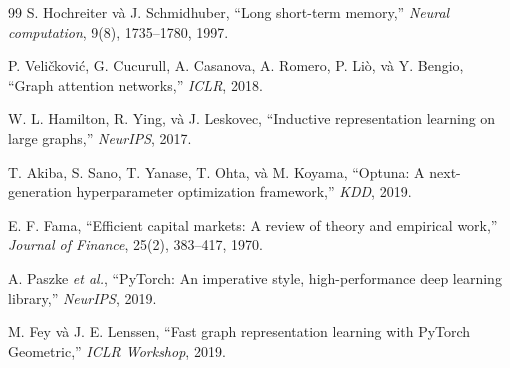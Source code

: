 \documentclass[12pt,a4paper]{article}
\begin{document}
\begin{thebibliography}{99}
S. Hochreiter và J. Schmidhuber, ``Long short-term memory,'' \emph{Neural computation}, 9(8), 1735--1780, 1997.

P. Veličković, G. Cucurull, A. Casanova, A. Romero, P. Liò, và Y. Bengio, ``Graph attention networks,'' \emph{ICLR}, 2018.

W. L. Hamilton, R. Ying, và J. Leskovec, ``Inductive representation learning on large graphs,'' \emph{NeurIPS}, 2017.

T. Akiba, S. Sano, T. Yanase, T. Ohta, và M. Koyama, ``Optuna: A next-generation hyperparameter optimization framework,'' \emph{KDD}, 2019.

E. F. Fama, ``Efficient capital markets: A review of theory and empirical work,'' \emph{Journal of Finance}, 25(2), 383--417, 1970.

A. Paszke \emph{et al.}, ``PyTorch: An imperative style, high-performance deep learning library,'' \emph{NeurIPS}, 2019.

M. Fey và J. E. Lenssen, ``Fast graph representation learning with PyTorch Geometric,'' \emph{ICLR Workshop}, 2019.
\end{thebibliography}
\end{document}
